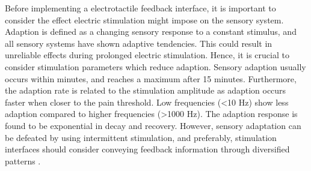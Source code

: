 Before implementing a electrotactile feedback interface, it is important to consider the effect electric stimulation might impose on the sensory system. \\
Adaption is defined as a changing sensory response to a constant stimulus, and all sensory systems have shown adaptive tendencies. This could result in unreliable effects during prolonged electric stimulation. Hence, it is crucial to consider stimulation parameters which reduce adaption. Sensory adaption usually occurs within minutes, and reaches a maximum after 15 minutes. Furthermore, the adaption rate is related to the stimulation amplitude as adaption occurs faster when closer to the pain threshold. Low frequencies (<10 Hz) show less adaption compared to higher frequencies (>1000 Hz). The adaption response is found to be exponential in decay and recovery. \cite{Buma2007,Szeto1982} 
However, sensory adaptation can be defeated by using intermittent stimulation, and preferably, stimulation interfaces should consider conveying feedback information through diversified patterns \cite{Szeto1982,Dosen2016}. 


